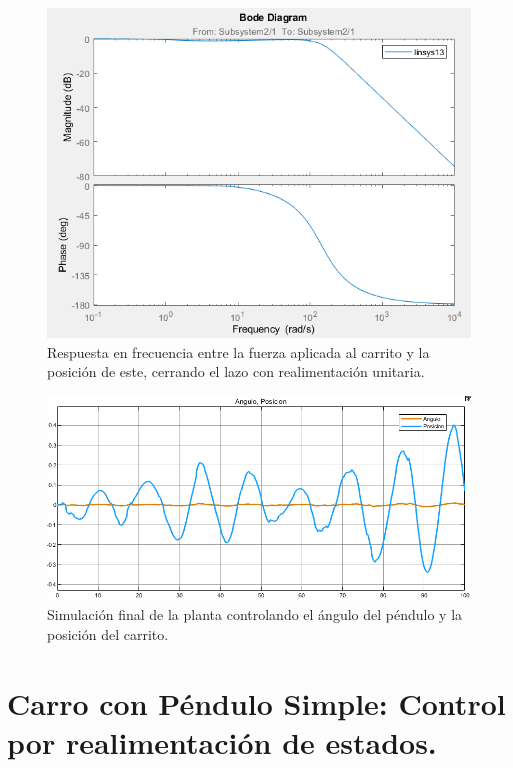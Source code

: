 \begin{figure}[H]
	\centering
	\includegraphics[width=0.8\linewidth]{Imagenes/loopshaping/bode_cerrando_p}
	\caption{Respuesta en frecuencia entre la fuerza aplicada al carrito y la posición de este, cerrando el lazo con realimentación unitaria.}
	\label{bode_cerrando_p}
\end{figure}


\begin{figure}[H]
	\centering
	\includegraphics[width=0.8\linewidth]{Imagenes/loopshaping/simulacion_final}
	\caption{Simulación final de la planta controlando el ángulo del péndulo y la posición del carrito.}
	\label{simulacion_solo_angulo}
\end{figure}
\section{Carro con Péndulo Simple: Control por realimentaci\'on de estados.}
